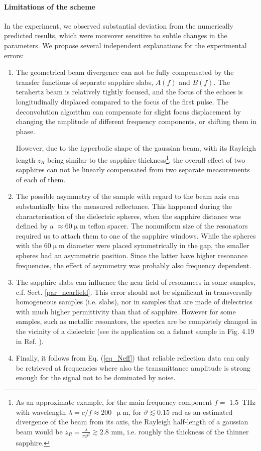 \paragraph{Limitations of the scheme} %
In the experiment, we observed substantial deviation  %
from the numerically predicted results, which were moreover sensitive to subtle changes in the parameters. We propose  several independent explanations for the experimental errors:
\begin{enumerate}
\item{The geometrical beam divergence can not be fully compensated by the transfer functions of separate sapphire slabs, $A(f)$ and $B(f)$. 
The terahertz beam is relatively tightly focused, and the focus of the echoes is longitudinally displaced compared to the focus of the first pulse. 
The deconvolution algorithm can compensate for slight focus displacement by changing the amplitude  of different frequency components, or shifting them in phase. 

However, due to the hyperbolic shape of the gaussian beam, with its Rayleigh length $z_{R}$ being similar to the sapphire thickness\footnote{As an approximate example, for the main frequency component $f =$ 1.5~THz with wavelength $\lambda = c / f \approx 200$~$\upmu$m, for $\vartheta \lesssim 0.15$ rad as an estimated divergence of the beam from its axis, the Rayleigh half-length of a gaussian beam would be $z_{R} = \frac{\lambda}{\pi \vartheta^{2}} \gtrsim 2.8$ mm, i.e. roughly the thickness of the thinner sapphire.}, the overall effect of two sapphires can not be linearly compensated from two separate measurements of each of them.} 
 \item{The possible asymmetry of the sample with regard to the beam axis can substantially bias the measured reflectance. This happened during the characterisation of the dielectric spheres, when the sapphire distance was defined by a $\approx$60$\upmu$m teflon spacer. The nonuniform size of the resonators required us to attach them to one of the sapphire windows. While the spheres with the 60$\upmu$m diameter were placed symmetrically in the gap, the smaller spheres had an asymmetric position. Since the latter have higher resonance frequencies, the effect of asymmetry was probably also frequency dependent. } 
 \item{The sapphire slabs can influence the near field of resonances in some samples, c.f. Sect. \ref{par_nearfield}. This error should not be significant in transversally homogeneous samples (i.e. slabs), nor in samples that are made of dielectrics with much higher permittivity than that of sapphire. However for some samples, such as metallic resonators, the spectra are be completely changed in the vicinity of a dielectric (see its application on a fishnet sample in Fig. 4.19 in Ref. \cite{yahiaoui2011phd}). }
 \item{Finally, it follows from Eq. (\ref{eq_Neff}) that reliable reflection data can only be retrieved at frequencies where also the transmittance amplitude is strong enough for the signal not to be dominated by noise. }
 \end{enumerate}
\label{srtm2}


